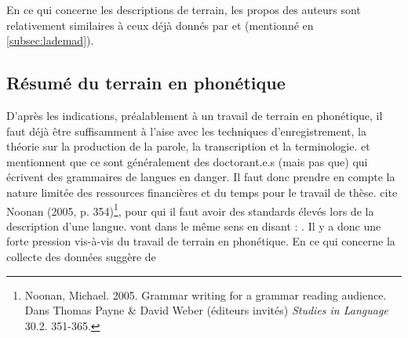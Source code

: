 En ce qui concerne les descriptions de terrain, les propos des auteurs sont relativement similaires à ceux déjà donnés par \textcite{ladefogedPhoneticDataAnalysis2003} et \textcite{maddiesonPhoneticFieldwork2001} (mentionné en \autoref{subsec:lademad}).










\subsection{Résumé du terrain en phonétique}

D'après les indications, préalablement à un travail de terrain en phonétique, il faut déjà être suffisamment à l'aise avec les techniques d'enregistrement, la théorie sur la production de la parole, la transcription et la terminologie. \textcite{bowernLinguisticFieldwork2015} et \textcite{riceSoundsGrammarWriting2014} mentionnent que ce sont généralement des doctorant.e.s (mais pas que) qui écrivent des grammaires de langues en danger. Il faut donc prendre en compte la nature limitée des ressources financières et du temps pour le travail de thèse. \textcite{riceSoundsGrammarWriting2014} cite Noonan (2005, p. 354)\footnote{Noonan, Michael. 2005. Grammar writing for a grammar reading audience. Dans Thomas Payne \& David Weber (éditeurs invités) \textit{Studies in Language} 30.2. 351-365.}, pour qui il faut avoir des standards élevés lors de la description d'une langue.
\textcite[251]{chelliahHandbookDescriptiveLinguistic2011} vont dans le même sens en disant : . Il y a donc une forte pression vis-à-vis du travail de terrain en phonétique.
En ce qui concerne la collecte des données \textcite[36]{bowernLinguisticFieldwork2015} suggère de \\


